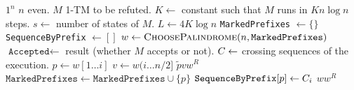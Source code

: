 \Input $1^n$
\Require $n$ even.
\Hardcode $M$ 1-TM to be refuted. 
\Hardcode $K \gets$ constant such that $M$ runs in $K n \log n$ steps.
\Hardcode $s \gets$ number of states of $M$. 
\Program
\State $L \gets 4K \log n$
\State \texttt{MarkedPrefixes} $\gets \{\}$
\State \texttt{SequenceByPrefix} $\gets []$
    \State $w \gets \Call{ChoosePalindrome}{n, \texttt{MarkedPrefixes}}$
        \State $\texttt{Accepted} \gets$ result (whether $M$ accepts or not).
        \State $C \gets$ crossing sequences of the execution. 
    \EndCustomBlock
            \State $p \gets w[1\ldots i]$
                        \State $v \gets w(i\ldots n/2]$
                        \Output $\tilde{p}vw^R$
                        \Halt
                    \EndIf
                \EndFor
                \State $\texttt{MarkedPrefixes} \gets \texttt{MarkedPrefixes} \cup \{p\}$
                \State $\texttt{SequenceByPrefix}[p] \gets C_i$
            \EndIf
        \EndFor
    \Else
        \Output $ww^R$
        \Halt
    \EndIf
\EndRepeatTimes
\Halt